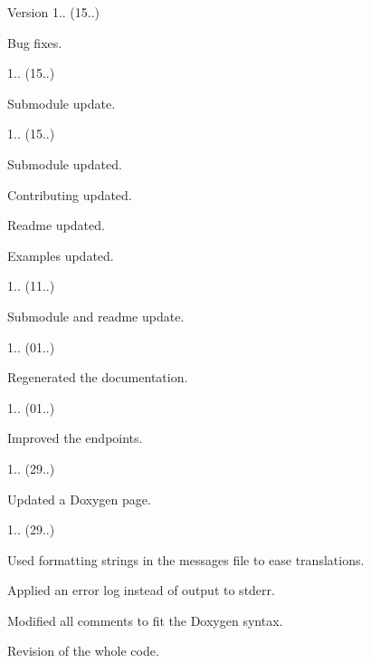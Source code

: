 \begin{DoxyVersion}{Version}
1.. (15..)
\begin{DoxyItemize}
\item Bug fixes. 
\end{DoxyItemize}

1.. (15..)
\begin{DoxyItemize}
\item Submodule update. 
\end{DoxyItemize}

1.. (15..)
\begin{DoxyItemize}
\item Submodule updated.
\item Contributing updated.
\item Readme updated.
\item Examples updated. 
\end{DoxyItemize}

1.. (11..)
\begin{DoxyItemize}
\item Submodule and readme update. 
\end{DoxyItemize}

1.. (01..)
\begin{DoxyItemize}
\item Regenerated the documentation. 
\end{DoxyItemize}

1.. (01..)
\begin{DoxyItemize}
\item Improved the endpoints. 
\end{DoxyItemize}

1.. (29..)
\begin{DoxyItemize}
\item Updated a Doxygen page. 
\end{DoxyItemize}

1.. (29..)
\begin{DoxyItemize}
\item Used formatting strings in the messages file to ease translations.
\item Applied an error log instead of output to stderr.
\item Modified all comments to fit the Doxygen syntax.
\item Revision of the whole code. 
\end{DoxyItemize}
\end{DoxyVersion}
